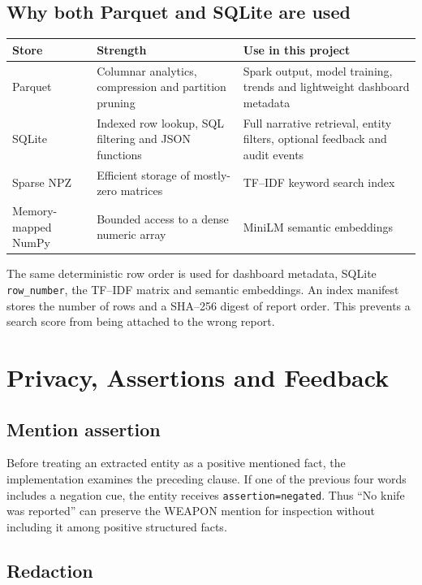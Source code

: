\documentclass[12pt,a4paper]{report}
\newcommand{\code}[1]{\texttt{#1}}
\begin{document}
\section{Why both Parquet and SQLite are used}

\begin{longtable}{p{}p{}p{}}
\toprule
Store & Strength & Use in this project \\
\midrule
\endhead
Parquet & Columnar analytics, compression and partition pruning & Spark output, model training, trends and lightweight dashboard metadata \\
SQLite & Indexed row lookup, SQL filtering and JSON functions & Full narrative retrieval, entity filters, optional feedback and audit events \\
Sparse NPZ & Efficient storage of mostly-zero matrices & TF--IDF keyword search index \\
Memory-mapped NumPy & Bounded access to a dense numeric array & MiniLM semantic embeddings \\
\bottomrule
\end{longtable}

The same deterministic row order is used for dashboard metadata, SQLite \code{row\_number}, the TF--IDF matrix and semantic embeddings. An index manifest stores the number of rows and a SHA--256 digest of report order. This prevents a search score from being attached to the wrong report.

\chapter{Privacy, Assertions and Feedback}

\section{Mention assertion}

Before treating an extracted entity as a positive mentioned fact, the implementation examines the preceding clause. If one of the previous four words includes a negation cue, the entity receives \code{assertion=negated}. Thus ``No knife was reported'' can preserve the WEAPON mention for inspection without including it among positive structured facts.

\section{Redaction}
\end{document}
